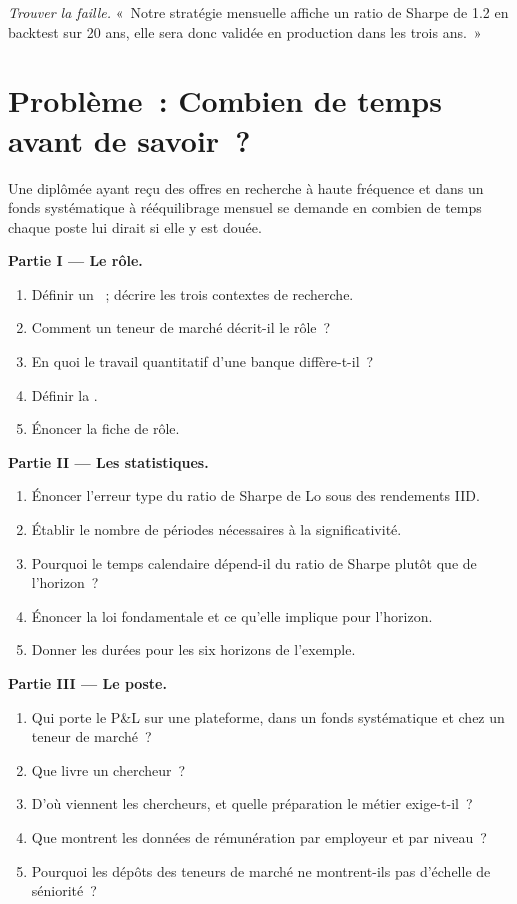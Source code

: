 \begin{exercise}[$\star\star\star$]\label{exo:in:quant-researcher:8}
\emph{Trouver la faille.} «~Notre stratégie mensuelle affiche un ratio de Sharpe de 1.2 en backtest sur 20 ans, elle sera donc validée
en production dans les trois ans.~»
\end{exercise}

\section{Problème~: Combien de temps avant de savoir~?}

\begin{problem}\label{pb:in:quant-researcher:1}
Une diplômée ayant reçu des offres en recherche à haute fréquence et dans un fonds systématique à rééquilibrage mensuel
se demande en combien de temps chaque poste lui dirait si elle y est douée.

\medskip\noindent\textbf{Partie I --- Le rôle.}
\begin{enumerate}
\item Définir un ~; décrire les trois contextes de recherche.
\item Comment un teneur de marché décrit-il le rôle~?
\item En quoi le travail quantitatif d'une banque diffère-t-il~?
\item Définir la .
\item Énoncer la fiche de rôle.
\end{enumerate}

\medskip\noindent\textbf{Partie II --- Les statistiques.}
\begin{enumerate}[resume]
\item Énoncer l'erreur type du ratio de Sharpe de Lo sous des rendements IID.
\item Établir le nombre de périodes nécessaires à la significativité.
\item Pourquoi le temps calendaire dépend-il du ratio de Sharpe plutôt que de l'horizon~?
\item Énoncer la loi fondamentale et ce qu'elle implique pour l'horizon.
\item Donner les durées pour les six horizons de l'exemple.
\end{enumerate}

\medskip\noindent\textbf{Partie III --- Le poste.}
\begin{enumerate}[resume]
\item Qui porte le P\&L sur une plateforme, dans un fonds systématique et chez un teneur de marché~?
\item Que livre un chercheur~?
\item D'où viennent les chercheurs, et quelle préparation le métier exige-t-il~?
\item Que montrent les données de rémunération par employeur et par niveau~?
\item Pourquoi les dépôts des teneurs de marché ne montrent-ils pas d'échelle de séniorité~?
\end{enumerate}


\end{problem}
